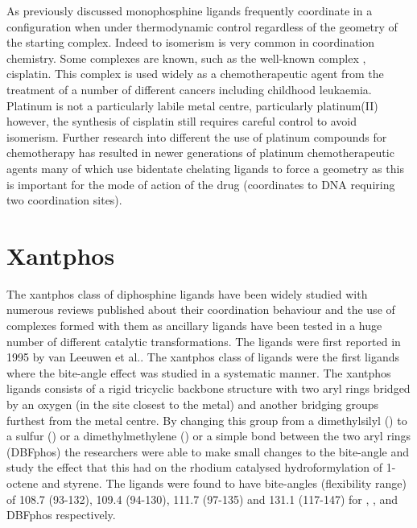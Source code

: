 As previously discussed monophosphine ligands frequently coordinate in a \trans{} configuration when under thermodynamic control regardless of the geometry of the starting complex.  Indeed \cis{} to \trans{} isomerism is very common in coordination chemistry.  Some \cis{} complexes are known, such as the well-known complex \ce{[PtCl2(NH3)2]}, cisplatin.  This complex is used widely as a chemotherapeutic agent from the treatment of a number of different cancers including childhood leukaemia.  Platinum is not a particularly labile metal centre, particularly platinum(II) however, the synthesis of cisplatin still requires careful control to avoid isomerism.  Further research into different the use of platinum compounds for chemotherapy has resulted in newer generations of platinum chemotherapeutic agents many of which use bidentate chelating ligands to force a \cis{} geometry as this is important for the mode of action of the drug (coordinates to DNA requiring two \cis{} coordination sites).

\section{Xantphos}

The xantphos class of diphosphine ligands have been widely studied with numerous reviews published about their coordination behaviour and the use of complexes formed with them as ancillary ligands have been tested in a huge number of different catalytic transformations.  The ligands were first reported in 1995 by van Leeuwen et al.\cite{Kranenburg1995}.  The xantphos class of ligands were the first ligands where the bite-angle effect was studied in a systematic manner.  The xantphos ligands consists of a rigid tricyclic backbone structure with two aryl rings bridged by an oxygen (in the site closest to the metal) and another bridging groups furthest from the metal centre.  By changing this group from a dimethylsilyl (\Phsixantphos) to a sulfur (\Phthixantphos) or a dimethylmethylene (\Phxantphos) or a simple bond between the two aryl rings (DBFphos) the researchers were able to make small changes to the bite-angle and study the effect that this had on the rhodium catalysed hydroformylation of 1-octene and styrene.  The ligands were found to have bite-angles (flexibility range) of 108.7 (93-132), 109.4 (94-130), 111.7 (97-135) and 131.1 (117-147) for \Phsixantphos, \Phthixantphos, \Phxantphos and DBFphos respectively.  

